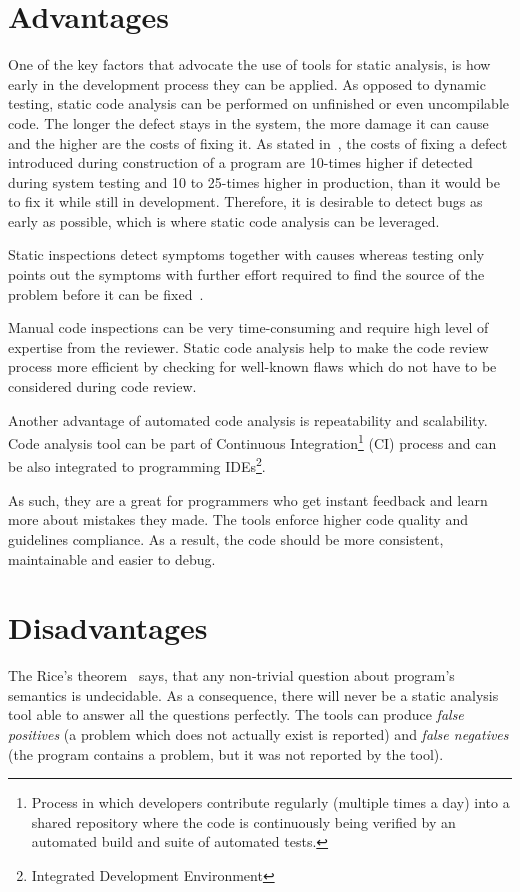 \documentclass[
  digital, %
  table,   %
  lof,     %
  lot,     %
  oneside,
]{fithesis3}
\begin{document}
\section{Advantages}
One of the key factors that advocate the use of tools for static analysis, is how early in the development process they can be applied. As opposed to dynamic testing, static code analysis can be performed on unfinished or even uncompilable code. The longer the defect stays in the system, the more damage it can cause and the higher are the costs of fixing it. As stated in~\cite[p. 29]{code-complete}, the costs of fixing a defect introduced during construction of a program are 10-times higher if detected during system testing and 10 to 25-times higher in production, than it would be to fix it while still in development. Therefore, it is desirable to detect bugs as early as possible, which is where static code analysis can be leveraged.

Static inspections detect symptoms together with causes whereas testing only points out the symptoms with further effort required to find the source of the problem before it can be fixed~\cite[p. 472]{code-complete}.

Manual code inspections can be very time-consuming and require high level of expertise from the reviewer. Static code analysis help to make the code review process more efficient by checking for well-known flaws which do not have to be considered during code review.

Another advantage of automated code analysis is repeatability and scalability. Code analysis tool can be part of Continuous Integration\footnote{Process in which developers contribute regularly (multiple times a day) into a shared repository where the code is continuously being verified by an automated build and suite of automated tests.} (CI) process and can be also integrated to programming IDEs\footnote{Integrated Development Environment}. 

As such, they are a great for programmers who get instant feedback and learn more about mistakes they made. The tools enforce higher code quality and guidelines compliance. As a result, the code should be more consistent, maintainable and easier to debug.
  
\section{Disadvantages}
The Rice's theorem~\cite{direct-proofs-of-rices-theorem} says, that any non-trivial question about program's semantics is undecidable. As a consequence, there will never be a static analysis tool able to answer all the questions perfectly. The tools can produce \textit{false positives} (a problem which does not actually exist is reported) and \textit{false negatives} (the program contains a problem, but it was not reported by the tool).
\end{document}
